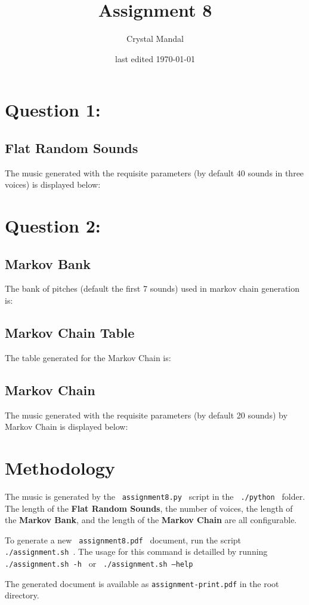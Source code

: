 \documentclass[12pt,letterpaper]{article}
\title{Assignment 8}
\author{Crystal Mandal}
\date{last edited \today}
\newcommand{\code}[1]{\colorbox{light-gray}{\texttt{#1}}}
\begin{document}
\maketitle

\section{Question 1:}
\subsection{Flat Random Sounds}
The music generated with the requisite parameters (by default 40 sounds in 
three voices) is displayed below:


\section{Question 2:}
\subsection{Markov Bank}
The bank of pitches (default the first 7 sounds) used in markov chain generation is:


\subsection{Markov Chain Table}
The table generated for the Markov Chain is:


\subsection{Markov Chain}
The music generated with the requisite parameters (by default 20 sounds) 
by Markov Chain is displayed below:


\section{Methodology}
The music is generated by the \code{ assignment8.py } script in the 
\code{ ./python } folder. The length of the \textbf{Flat Random Sounds}, 
the number of voices, the length of the \textbf{Markov Bank}, and the 
length of the \textbf{Markov Chain} are all configurable. 

To generate a new \code{ assignment8.pdf } document, run the script 
\code{ ./assignment.sh  }. The usage for this command is detailled 
by running \code{ ./assignment.sh -h  } or \code { ./assignment.sh --help  }

The generated document is available as \code{assignment-print.pdf} in the 
root directory.
\end{document}
